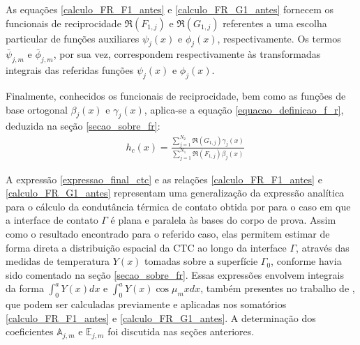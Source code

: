 As equações \eqref{calculo_FR_F1_antes} e \eqref{calculo_FR_G1_antes} fornecem os funcionais de reciprocidade $\Re(F_{1,j})$ e $\Re(G_{1,j})$ referentes a uma escolha particular de funções auxiliares $\psi_j(x)$ e $\phi_j(x)$, respectivamente. Os termos $\bar{\psi}_{j, m}$ e $\bar{\phi}_{j, m}$, por sua vez, correspondem respectivamente às transformadas integrais das referidas funções $\psi_j(x)$ e $\phi_j(x)$. 

Finalmente, conhecidos os funcionais de reciprocidade, bem como as funções de base ortogonal $\beta_j(x)$ e $\gamma_j(x)$, aplica-se a equação \eqref{equacao_definicao_f_r}, deduzida na seção \ref{secao_sobre_fr}:
\begin{align}
& h_c(x) %
= \frac{\displaystyle\sum_{j=1}^{N_2} \Re(G_{1,j}) \gamma_j(x)}{\displaystyle\sum_{j=1}^{N_1} \Re(F_{1,j}) \beta_j(x)} \label{expressao_final_ctc}
\end{align}

A expressão \eqref{expressao_final_ctc} e as relações \eqref{calculo_FR_F1_antes} e \eqref{calculo_FR_G1_antes} representam uma generalização da expressão analítica para o cálculo da condutância térmica de contato obtida por \cite{tese_padilha} para o caso em que a interface de contato $\Gamma$ é plana e paralela às bases do corpo de prova. Assim como o resultado encontrado para o referido caso, elas permitem estimar de forma direta a distribuição espacial da CTC ao longo da interface $\Gamma$, através das medidas de temperatura $Y(x)$ tomadas sobre a superfície $\Gamma_0$, conforme havia sido comentado na seção \ref{secao_sobre_fr}. Essas expressões envolvem integrais da forma $\displaystyle \int_0^a Y(x)dx$ e $\displaystyle \int_0^a Y(x)\cos\mu_m x dx$, também presentes no trabalho de \cite{tese_padilha}, que podem ser calculadas previamente e aplicadas nos somatórios \eqref{calculo_FR_F1_antes} e \eqref{calculo_FR_G1_antes}. A determinação dos coeficientes $\mathbb{A}_{j,m}$ e $\mathbb{E}_{j,m}$ foi discutida nas seções anteriores.


